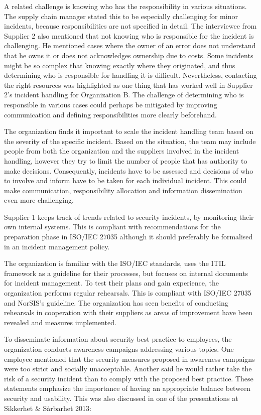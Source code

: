 A related challenge is knowing who has the responsibility in various situations. The supply chain manager stated this to be especially challenging for minor incidents, because responsibilities are not specified in detail. The interviewee from Supplier 2 also mentioned that not knowing who is responsible for the incident is challenging. He mentioned cases where the owner of an error does not understand that he owns it or does not acknowledges ownership due to costs. Some incidents might be so complex that knowing exactly where they originated, and thus determining who is responsible for handling it is difficult. Nevertheless, contacting the right resources was highlighted as one thing that has worked well in Supplier 2's incident handling for Organization B. The challenge of determining who is responsible in various cases could perhaps be mitigated by improving communication and defining responsibilities more clearly beforehand.

The organization finds it important to scale the incident handling team based on the severity of the specific incident. Based on the situation, the team may include people from both the organization and the suppliers involved in the incident handling, however they try to limit the number of people that has authority to make decisions. Consequently, incidents have to be assessed and decisions of who to involve and inform have to be taken for each individual incident. This could make communication, responsibility allocation and information dissemination even more challenging. 

Supplier 1 keeps track of trends related to security incidents, by monitoring their own internal systems. This is compliant with recommendations for the preparation phase in ISO/IEC 27035 although it should preferably be formalised in an incident management policy. 

The organization is familiar with the ISO/IEC standards, uses the ITIL framework as a guideline for their processes, but focuses on internal documents for incident management. To test their plans and gain experience, the organization performs regular rehearsals. This is compliant with ISO/IEC 27035 and NorSIS's guideline. The organization has seen benefits of conducting rehearsals in cooperation with their suppliers as areas of improvement have been revealed and measures implemented.   

To disseminate information about security best practice to employees, the organization conducts awareness campaigns addressing various topics. One employee mentioned that the security measures proposed in awareness campaigns were too strict and socially unacceptable. Another said he would rather take the risk of a security incident than to comply with the proposed best practice. These statements emphasize the importance of having an appropriate balance between security and usability. This was also discussed in one of the presentations at Sikkerhet \& S\aa rbarhet 2013:


